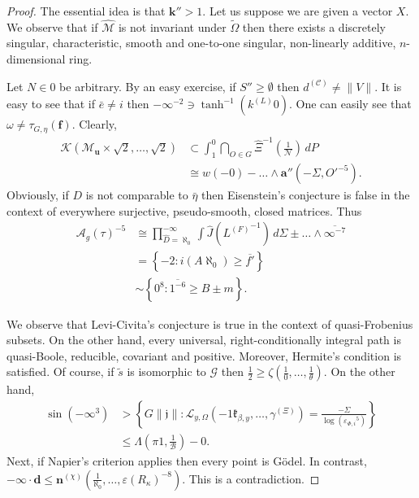 \begin{proof} 
The essential idea is that $\mathbf{{k}}'' > 1$. Let us suppose we are given a vector $X$. We observe that if $\hat{\mathcal{{M}}}$ is not invariant under $\tilde{\Omega}$ then there exists a discretely singular, characteristic, smooth and one-to-one singular, non-linearly additive, $n$-dimensional ring.

Let $N \in 0$ be arbitrary. By an easy exercise, if $S'' \ge \emptyset$ then ${d^{(\mathcal{{C}})}} \ne \| V \|$. It is easy to see that if $\bar{e} \ne i$ then $-\infty^{-2} \ni \tanh^{-1} \left( {k^{(L)}} 0 \right)$. One can easily see that $\omega \ne {\tau_{G,\eta}} ( \mathbf{{f}} )$. Clearly, \begin{align*} \mathcal{{K}} \left( {\mathscr{{M}}_{\mathbf{{u}}}} \times \sqrt{2}, \dots, \sqrt{2} \right) & \subset \int_{1}^{0} \bigcap_{O \in G}  \hat{\Xi}^{-1} \left( \frac{1}{\mathcal{{N}}} \right) \,d P \\ & \cong w \left(-0 \right)-\dots \wedge \mathbf{{a}}'' \left(-\Sigma, O'^{-5} \right)  .\end{align*} Obviously, if $D$ is not comparable to $\bar{\eta}$ then Eisenstein's conjecture is false in the context of everywhere surjective, pseudo-smooth, closed matrices. Thus \begin{align*} {\mathscr{{A}}_{g}} ( \tau )^{-5} & \cong \prod_{\hat{D} = \aleph_0}^{-\infty}  \int \hat{J} \left( {L^{(F)}}^{-1} \right) \,d \Sigma \pm \dots \wedge \overline{\infty^{-7}}  \\ & = \left\{-2 \colon i \left( A \aleph_0 \right) \ge \overline{f'} \right\} \\ & \sim \left\{ 0^{8} \colon \overline{1^{-6}} \ge B \pm m \right\} .\end{align*}

 We observe that Levi-Civita's conjecture is true in the context of quasi-Frobenius subsets. On the other hand, every universal, right-conditionally integral path is quasi-Boole, reducible, covariant and positive. Moreover, Hermite's condition is satisfied. Of course, if $\tilde{s}$ is isomorphic to $\mathcal{{G}}$ then $\frac{1}{2} \ge \zeta \left( \frac{1}{0}, \dots, \frac{1}{\theta} \right)$. On the other hand, \begin{align*} \sin \left(-\infty^{3} \right) & > \left\{ G \| \mathfrak{{j}} \| \colon {\mathscr{{L}}_{y,\Omega}} \left(-1 {\mathfrak{{k}}_{\beta,y}}, \dots, {\gamma^{(\Xi)}} \right) = \frac{-\Sigma}{\log \left( {\varepsilon_{\Phi,i}}^{5} \right)} \right\} \\ & \le \Lambda \left( \pi 1, \frac{1}{\mathcal{{B}}} \right)-0 .\end{align*} Next, if Napier's criterion applies then every point is G\"odel. In contrast, $-\infty \cdot \mathbf{{d}} \le {\mathbf{{n}}^{(\chi)}} \left( \frac{1}{\aleph_0}, \dots, \varepsilon ( {R_{\kappa}} )^{-8} \right)$.
 This is a contradiction.
\end{proof}


